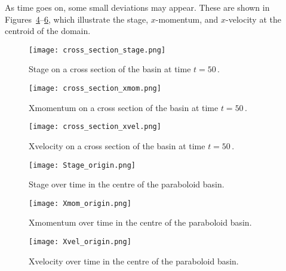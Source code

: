 As time goes on, some small deviations may appear. These are shown in Figures~\ref{fig:w_centre}--\ref{fig:u_centre}, which illustrate the stage, $x$-momentum, and $x$-velocity at the centroid of the domain.


\begin{figure}
\begin{center}
\texttt{[image: cross\_section\_stage.png]}
\caption{Stage on a cross section of the basin at time $t=50$\,.}
\label{fig:cs_stage}
\end{center}
\end{figure}

\begin{figure}
\begin{center}
\texttt{[image: cross\_section\_xmom.png]}
\caption{Xmomentum on a cross section of the basin at time $t=50$\,.}
\label{fig:cs_xmom}
\end{center}
\end{figure}

\begin{figure}
\begin{center}
\texttt{[image: cross\_section\_xvel.png]}
\caption{Xvelocity on a cross section of the basin at time $t=50$\,.}
\label{fig:cs_xvel}
\end{center}
\end{figure}




\begin{figure}
\begin{center}
\texttt{[image: Stage\_origin.png]}
\caption{Stage over time in the centre of the paraboloid basin.}
\label{fig:w_centre}
\end{center}
\end{figure}

\begin{figure}
\begin{center}
\texttt{[image: Xmom\_origin.png]}
\caption{Xmomentum over time in the centre of the paraboloid basin.}
\label{fig:p_centre}
\end{center}
\end{figure}

\begin{figure}
\begin{center}
\texttt{[image: Xvel\_origin.png]}
\caption{Xvelocity over time in the centre of the paraboloid basin.}
\label{fig:u_centre}
\end{center}
\end{figure}


\endinput
